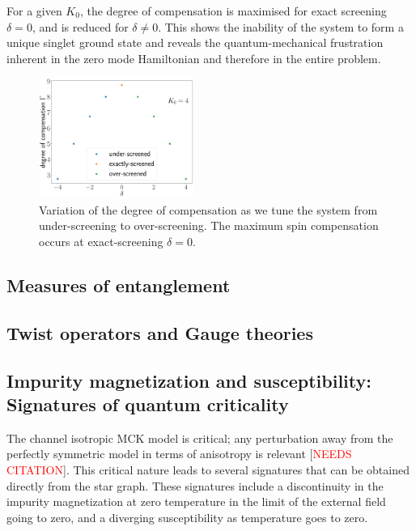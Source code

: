 \documentclass[reprint,prb,superscriptaddress]{revtex4-2}
\begin{document}
For a given \(K_0\), the degree of compensation is maximised for exact screening \(\delta=0\), and is reduced for \(\delta \neq 0\). This shows the inability of the system to form a unique singlet ground state and reveals the quantum-mechanical frustration inherent in the zero mode Hamiltonian and therefore in the entire problem.
\begin{figure}[htpb]
	\centering
	\includegraphics[width=0.45\textwidth]{../numerics/deg_of_comp.pdf}
	\caption{Variation of the degree of compensation as we tune the system from under-screening to over-screening. The maximum spin compensation occurs at exact-screening \(\delta=0\).}
\end{figure}

\subsection{Measures of entanglement}

\subsection{Twist operators and Gauge theories}

\subsection{Impurity magnetization and susceptibility: Signatures of quantum criticality}
The channel isotropic MCK model is critical; any perturbation away from the perfectly symmetric model in terms of anisotropy is relevant [\textcolor{red}{NEEDS CITATION}]. This critical nature leads to several signatures that can be obtained directly from the star graph. These signatures include a discontinuity in the impurity magnetization at zero temperature in the limit of the external field going to zero, and a diverging susceptibility as temperature goes to zero.
\end{document}
